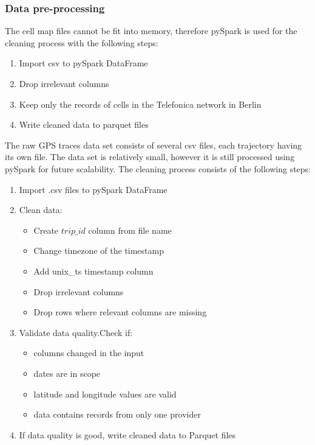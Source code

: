 \subsubsection{Data pre-processing}
The cell map files cannot be fit into memory, therefore pySpark is used for the cleaning process with the following steps: 
\begin{enumerate}
    \item Import csv to pySpark DataFrame
    \item Drop irrelevant columns
    \item Keep only the records of cells in the Telefonica network in Berlin
    \item Write cleaned data to parquet files
\end{enumerate}

The raw GPS traces data set consists of several csv files, each trajectory having its own file. The data set is relatively small, however it is still processed using pySpark for future scalability. The cleaning process consists of the following steps: 
\begin{enumerate}
    \item Import .csv files to pySpark DataFrame
    \item Clean data:
    \begin{itemize}
        \item Create $trip\_id$ column from file name
        \item Change timezone of the timestamp
        \item Add unix\_ts timestamp column
        \item Drop irrelevant columns
        \item Drop rows where relevant columns are missing
    \end{itemize}
    \item Validate data quality.Check if: 
     \begin{itemize}
        \item columns changed in the input
        \item dates are in scope
        \item latitude and longitude values are valid
        \item data contains records from only one provider
    \end{itemize}
    \item If data quality is good, write cleaned data to Parquet files
\end{enumerate}

